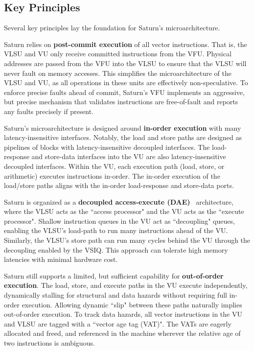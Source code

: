 \subsection{Key Principles}

Several key principles lay the foundation for Saturn's microarchitecture.

Saturn relies on \textbf{post-commit execution} of all vector instructions.
That is, the VLSU and VU only receive committed instructions from the VFU.
Physical addresses are passed from the VFU into the VLSU to ensure that the VLSU will never fault on memory accesses.
This simplifies the microarchitecture of the VLSU and VU, as all operations in these units are effectively non-speculative.
To enforce precise faults ahead of commit, Saturn's VFU implements an aggressive, but precise mechanism that validates instructions are free-of-fault and reports any faults precisely if present.

Saturn's microarchitecture is designed around \textbf{in-order execution} with many latency-insensitive interfaces.
Notably, the load and store paths are designed as pipelines of blocks with latency-insensitive decoupled interfaces.
The load-response and store-data interfaces into the VU are also latency-insensitive decoupled interfaces.
Within the VU, each execution path (load, store, or arithmetic) executes instructions in-order.
The in-order execution of the load/store paths aligns with the in-order load-response and store-data ports.

Saturn is organized as a \textbf{decoupled access-execute (DAE)}~\cite{decoupled_execute} architecture, where the VLSU acts as the ``access processor" and the VU acts as the ``execute processor".
Shallow instruction queues in the VU act as ``decoupling" queues, enabling the VLSU's load-path to run many instructions ahead of the VU.
Similarly, the VLSU's store path can run many cycles behind the VU through the decoupling enabled by the VSIQ.
This approach can tolerate high memory latencies with minimal hardware cost.

Saturn still supports a limited, but sufficient capability for \textbf{out-of-order execution}.
The load, store, and execute paths in the VU execute independently, dynamically stalling for structural and data hazards without requiring full in-order execution.
Allowing dynamic ``slip" between these paths naturally implies out-of-order execution.
To track data hazards, all vector instructions in the VU and VLSU are tagged with a ``vector age tag (VAT)".
The VATs are eagerly allocated and freed, and referenced in the machine wherever the relative age of two instructions is ambiguous.

